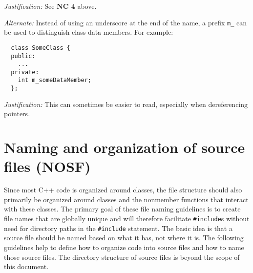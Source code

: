 \begin{itemize}
\textit{Justification:} See {}\textbf{NC 4} above.

\textit{Alternate:} Instead of using an underscore at the end of the name, a prefix {}\texttt{m\_} can be used to distinguish class data members.  For example:

{\small\begin{verbatim}
  class SomeClass {
  public:
    ...
  private:
    int m_someDataMember;
  };
\end{verbatim}}

\textit{Justification:}  This can sometimes be easier to read, especially when dereferencing pointers.

\end{itemize}


%
\section{Naming and organization of source files (NOSF)}
\label{sec:NOSF}
%

Since most C++ code is organized around classes, the file structure
should also primarily be organized around classes and the nonmember
functions that interact with these classes.  The primary goal of these
file naming guidelines is to create file names that are globally
unique and will therefore facilitate {}\texttt{\#include}s without
need for directory paths in the {}\texttt{\#include} statement.  The
basic idea is that a source file should be named based on what it has,
not where it is.  The following guidelines help to define how to
organize code into source files and how to name those source files.
The directory structure of source files is beyond the scope of this
document.


